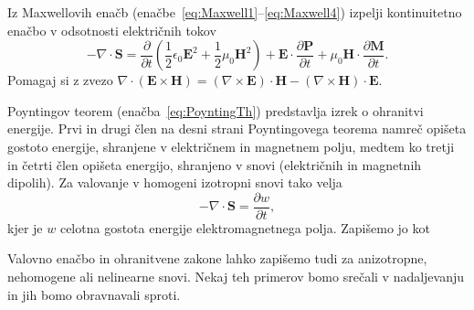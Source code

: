 \begin{definition}
Iz Maxwellovih enačb (enačbe~\ref{eq:Maxwell1}--\ref{eq:Maxwell4}) 
izpelji kontinuitetno enačbo v odsotnosti električnih tokov
\begin{equation}
-\nabla\cdot\mathbf{\mathbf{S}}=\frac{\partial}{\partial t}\left(\frac{1}{2}\epsilon_{0}\mathbf{E}^{2}+
\frac{1}{2}\mu_{0}\mathbf{H}^{2}\right)+\mathbf{E}\cdot\frac{\partial\mathbf{P}}{\partial t}+
\mu_{0}\mathbf{H}\cdot\frac{\partial\mathbf{M}}{\partial t}.
\label{eq:PoyntingTh}
\end{equation}
Pomagaj si z zvezo $\nabla\cdot(\mathbf{E}\times\mathbf{H})=(\nabla\times\mathbf{E})\cdot\mathbf{H}-
(\nabla\times\mathbf{H})\cdot\mathbf{E}$.
\end{definition}

Poyntingov teorem (enačba~\ref{eq:PoyntingTh}) predstavlja
izrek o ohranitvi energije. Prvi in drugi člen na desni strani Poyntingovega 
teorema namreč opišeta gostoto energije, shranjene v električnem in magnetnem
polju, medtem ko tretji in četrti člen opišeta energijo,
shranjeno v snovi (električnih in magnetnih dipolih). Za valovanje
v homogeni izotropni snovi tako velja
\begin{equation}
-\nabla\cdot\mathbf{S}=\frac{\partial w}{\partial t},
\end{equation}
kjer je $w$ celotna
gostota energije elektromagnetnega polja. Zapišemo jo kot 

Valovno enačbo in ohranitvene zakone lahko zapišemo tudi za anizotropne,
nehomogene ali nelinearne snovi. Nekaj teh primerov bomo srečali v nadaljevanju
in jih bomo obravnavali sproti.

